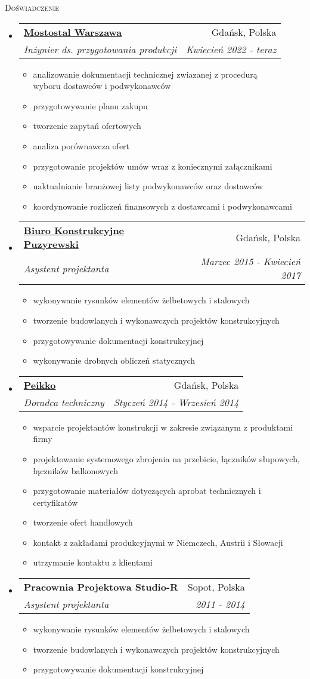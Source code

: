 \documentclass[letterpaper,11pt]{article}
\makeatletter
\newcommand{\resheading}[1]{
  \begin{tcolorbox}
  \textsc{#1}
  \end{tcolorbox}
}
\newcommand{\resitem}[1]{\item #1 \vspace{-2pt}}
\newcommand{\ressubheading}[4]{
\begin{tabular*}{6.5in}{l@{\extracolsep{\fill}}r}
		\textbf{#1} & #2 \\
		\textit{#3} & \textit{#4} \\
\end{tabular*}\vspace{-6pt}}
\makeatother
\begin{document}
\resheading{Doświadczenie}
\begin{itemize}

\item
  \ressubheading{\href{www.mostostal.waw.pl}{Mostostal Warszawa}}{Gdańsk, Polska}{Inżynier ds. przygotowania produkcji}{Kwiecień 2022 - teraz}
  \begin{itemize}
    \resitem{analizowanie dokumentacji technicznej zwiazanej z procedurą \\ wyboru dostawców i podwykonawców}
    \resitem{przygotowywanie planu zakupu}
    \resitem{tworzenie zapytań ofertowych}
    \resitem{analiza porównawcza ofert}
    \resitem{przygotowanie projektów umów wraz z koniecznymi załącznikami}
    \resitem{uaktualnianie branżowej listy podwykonawców oraz dostawców}
    \resitem{koordynowanie rozliczeń finansowych z dostawcami i podwykonawcami}
  \end{itemize}

\item
  \ressubheading{\href{www.puzyrewski.pl}{Biuro Konstrukcyjne Puzyrewski}}{Gdańsk, Polska}{Asystent projektanta}{Marzec 2015 - Kwiecień 2017}
  \begin{itemize}
    \resitem{wykonywanie rysunków elementów żelbetowych i stalowych}
    \resitem{tworzenie budowlanych i wykonawczych projektów konstrukcyjnych}
    \resitem{przygotowywanie dokumentacji konstrukcyjnej}
    \resitem{wykonywanie drobnych obliczeń statycznych}
  \end{itemize}

\item
  \ressubheading{\href{www.peikko.pl}{Peikko}}{Gdańsk, Polska}{Doradca techniczny}{Styczeń 2014 - Wrzesień 2014}
  \begin{itemize}
    \resitem{wsparcie projektantów konstrukcji w zakresie związanym z produktami firmy}
    \resitem{projektowanie systemowego zbrojenia na przebicie, łączników słupowych, łączników balkonowych}
    \resitem{przygotowanie materiałów dotyczących aprobat technicznych i certyfikatów}
    \resitem{tworzenie ofert handlowych}
    \resitem{kontakt z zakładami produkcyjnymi w Niemczech, Austrii i Słowacji}
    \resitem{utrzymanie kontaktu z klientami}
  \end{itemize}

\item 
  \ressubheading{Pracownia Projektowa Studio-R}{Sopot, Polska}{Asystent projektanta}{2011 - 2014}
  \begin{itemize}
    \resitem{wykonywanie rysunków elementów żelbetowych i stalowych}
    \resitem{tworzenie budowlanych i wykonawczych projektów konstrukcyjnych}
    \resitem{przygotowywanie dokumentacji konstrukcyjnej}
  \end{itemize}
  

\end{itemize}
\end{document}
